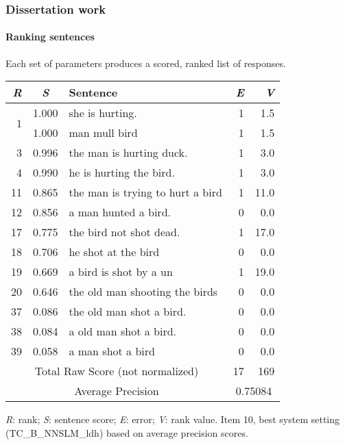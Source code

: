 \documentclass{beamer}
\begin{document}
\begin{frame}
\frametitle{Dissertation work}
\framesubtitle{Ranking sentences}
\footnotesize{Each set of parameters produces a scored, ranked list of responses.}
\begin{center}
\scriptsize
\begin{table}
\begin{tabular}{|r|c|l|r|r|}
 \hline
 \textit{R} & \textit{S} & Sentence & \textit{E} & \textit{V}\\
 \hline
 \hline
\multirow{2}{*}{1} & 1.000 & she is hurting. & 1 & 1.5 \\
& 1.000 & man mull bird & 1 & 1.5 \\
\hline
3 & 0.996 & the man is hurting duck. & 1 & 3.0 \\
4 & 0.990 & he is hurting the bird. & 1 & 3.0 \\
\hline
11 & 0.865 & the man is trying to hurt a bird & 1 & 11.0 \\
12 & 0.856 & a man hunted a bird. & 0 & 0.0 \\
\hline
17 & 0.775 & the bird not shot dead.  & 1 & 17.0 \\
18 & 0.706 & he shot at the bird & 0 & 0.0 \\
19 & 0.669 & a bird is shot by a un & 1 & 19.0 \\
20 & 0.646 & the old man shooting the birds & 0 & 0.0 \\
\hline
37 & 0.086 & the old man shot a bird. & 0 & 0.0 \\
38 & 0.084 & a old man shot a bird. & 0 & 0.0 \\
39 & 0.058 & a man shot a bird & 0 & 0.0 \\
  \hline
  \hline
  \multicolumn{3}{|c|}{Total Raw Score (not normalized)} & 17 & 169 \\
  \hline
  \multicolumn{3}{|c|}{Average Precision} & \multicolumn{2}{c|}{0.75084} \\
 \hline
\end{tabular}
\end{table}
\end{center}
\footnotesize{\textit{R}: rank; \textit{S}: sentence score; \textit{E}: error; \textit{V}: rank value.
Item 10, best system setting (TC\_B\_NNSLM\_ldh) based on average precision scores.}

\end{frame}
\end{document}
